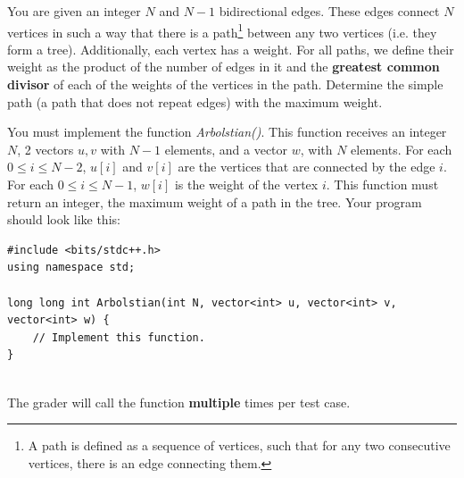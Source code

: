 \documentclass[12pt]{scrartcl}
\begin{document}
    
    
    \vspace{10pt}

    
    
        You are given an integer $N$ and $N - 1$ bidirectional edges. These edges connect $N$ vertices in such a way that there is a path\footnote{A path is defined as a sequence of vertices, such that for any two consecutive vertices, there is an edge connecting them.} between any two vertices (i.e. they form a tree). Additionally, each vertex has a weight. For all paths, we define their weight as the product of the number of edges in it and the {\bfseries greatest common divisor} of each of the weights of the vertices in the path. Determine the simple path (a path that does not repeat edges) with the maximum weight.
    

        You must implement the function \textit{Arbolstian()}. This function receives an integer $N$, 2 vectors $u, v$ with $N - 1$ elements, and a vector $w$, with $N$ elements. For each $0 \le i \le N - 2$, $u[i]$ and $v[i]$ are the vertices that are connected by the edge $i$. For each $0 \le i \le N - 1$, $w[i]$ is the weight of the vertex $i$. This function must return an integer, the maximum weight of a path in the tree.
        Your program should look like this:

\begin{verbatim}
#include <bits/stdc++.h>
using namespace std;

long long int Arbolstian(int N, vector<int> u, vector<int> v, vector<int> w) {
    // Implement this function.
}
    
\end{verbatim}

    The grader will call the function \textbf{multiple} times per test case.

    
\end{document}
